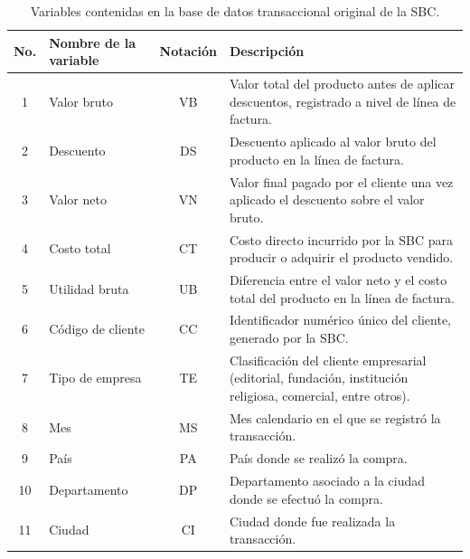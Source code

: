 \begin{table}[H]
\centering
\small
\caption{Variables contenidas en la base de datos transaccional original de la SBC.}
\label{tab:tab-variables-originales}
\renewcommand{\arraystretch}{1.25} 
\begin{tabular}{c l c p{6.2cm}} 
\hline
\textbf{No.} & \textbf{Nombre de la variable} & \textbf{Notación} & \textbf{Descripción} \\ \hline

1  & Valor bruto           
   & VB 
   & Valor total del producto antes de aplicar descuentos, registrado a nivel de línea de factura. \\

2  & Descuento             
   & DS 
   & Descuento aplicado al valor bruto del producto en la línea de factura. \\

3  & Valor neto            
   & VN
   & Valor final pagado por el cliente una vez aplicado el descuento sobre el valor bruto. \\

4  & Costo total           
   & CT
   & Costo directo incurrido por la SBC para producir o adquirir el producto vendido. \\

5  & Utilidad bruta        
   & UB
   & Diferencia entre el valor neto y el costo total del producto en la línea de factura. \\

6  & Código de cliente     
   & CC
   & Identificador numérico único del cliente, generado por la SBC. \\

7  & Tipo de empresa       
   & TE
   & Clasificación del cliente empresarial (editorial, fundación, institución religiosa, comercial, entre otros). \\

8  & Mes                  
   & MS
   & Mes calendario en el que se registró la transacción. \\

9  & País                 
   & PA
   & País donde se realizó la compra. \\

10 & Departamento          
   & DP
   & Departamento asociado a la ciudad donde se efectuó la compra. \\

11 & Ciudad               
   & CI
   & Ciudad donde fue realizada la transacción. \\


\end{tabular}
\end{table}

